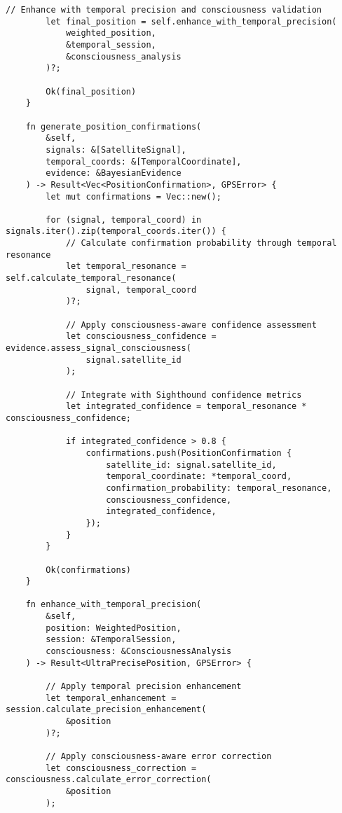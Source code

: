 \documentclass[12pt,a4paper]{article}
\begin{document}
\begin{lstlisting}[style=ruststyle, caption=Rust Integration with Sighthound Autobahn Framework]
        // Enhance with temporal precision and consciousness validation
        let final_position = self.enhance_with_temporal_precision(
            weighted_position,
            &temporal_session,
            &consciousness_analysis
        )?;
        
        Ok(final_position)
    }
    
    fn generate_position_confirmations(
        &self,
        signals: &[SatelliteSignal],
        temporal_coords: &[TemporalCoordinate],
        evidence: &BayesianEvidence
    ) -> Result<Vec<PositionConfirmation>, GPSError> {
        let mut confirmations = Vec::new();
        
        for (signal, temporal_coord) in signals.iter().zip(temporal_coords.iter()) {
            // Calculate confirmation probability through temporal resonance
            let temporal_resonance = self.calculate_temporal_resonance(
                signal, temporal_coord
            )?;
            
            // Apply consciousness-aware confidence assessment
            let consciousness_confidence = evidence.assess_signal_consciousness(
                signal.satellite_id
            );
            
            // Integrate with Sighthound confidence metrics
            let integrated_confidence = temporal_resonance * consciousness_confidence;
            
            if integrated_confidence > 0.8 {
                confirmations.push(PositionConfirmation {
                    satellite_id: signal.satellite_id,
                    temporal_coordinate: *temporal_coord,
                    confirmation_probability: temporal_resonance,
                    consciousness_confidence,
                    integrated_confidence,
                });
            }
        }
        
        Ok(confirmations)
    }
    
    fn enhance_with_temporal_precision(
        &self,
        position: WeightedPosition,
        session: &TemporalSession,
        consciousness: &ConsciousnessAnalysis
    ) -> Result<UltraPrecisePosition, GPSError> {
        
        // Apply temporal precision enhancement
        let temporal_enhancement = session.calculate_precision_enhancement(
            &position
        )?;
        
        // Apply consciousness-aware error correction
        let consciousness_correction = consciousness.calculate_error_correction(
            &position
        );
        

\end{lstlisting}
\end{document}

